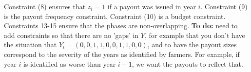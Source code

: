 \documentclass[11pt]{article}
\begin{document}
    Constraint (8) ensures that $z_i = 1$ if a payout was issued in year $i$. Constraint (9) is the payout frequency constraint. Constraint (10) is a budget constraint. Constraints 13-15 ensure that the phases are non-overlapping. \textbf{To do:} need to add constraints so that there are no 'gaps' in $Y$, for example that you don't have the situation that $Y_t = (0,0,1,1,0,0,1,1,0,0)$, and to have the payout sizes correspond to the severity of the years as identified by farmers. For example, if year $i$ is identified as worse than year $i-1$, we want the payouts to reflect that.

    

  
\end{document}
